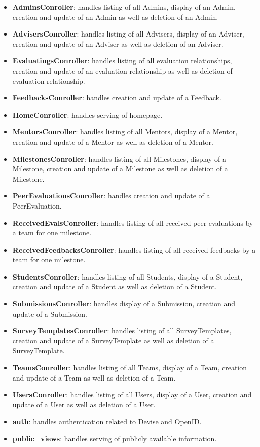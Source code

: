 \begin{itemize}
  \item \textbf{AdminsConroller}: handles listing of all Admins, display of an Admin, creation and update of an Admin as well as deletion of an Admin.
  \item \textbf{AdvisersConroller}: handles listing of all Advisers, display of an Adviser, creation and update of an Adviser as well as deletion of an Adviser.
  \item \textbf{EvaluatingsConroller}: handles listing of all evaluation relationships, creation and update of an evaluation relationship as well as deletion of evaluation relationship.
  \item \textbf{FeedbacksConroller}: handles creation and update of a Feedback.
  \item \textbf{HomeConroller}: handles serving of homepage.
  \item \textbf{MentorsConroller}: handles listing of all Mentors, display of a Mentor, creation and update of a Mentor as well as deletion of a Mentor.
  \item \textbf{MilestonesConroller}: handles listing of all Milestones, display of a Milestone, creation and update of a Milestone as well as deletion of a Milestone.
  \item \textbf{PeerEvaluationsConroller}: handles creation and update of a PeerEvaluation.
  \item \textbf{ReceivedEvalsConroller}: handles listing of all received peer evaluations by a team for one milestone.
  \item \textbf{ReceivedFeedbacksConroller}: handles listing of all received feedbacks by a team for one milestone.
  \item \textbf{StudentsConroller}: handles listing of all Students, display of a Student, creation and update of a Student as well as deletion of a Student.
  \item \textbf{SubmissionsConroller}: handles display of a Submission, creation and update of a Submission.
  \item \textbf{SurveyTemplatesConroller}: handles listing of all SurveyTemplates, creation and update of a SurveyTemplate as well as deletion of a SurveyTemplate.
  \item \textbf{TeamsConroller}: handles listing of all Teams, display of a Team, creation and update of a Team as well as deletion of a Team.
  \item \textbf{UsersConroller}: handles listing of all Users, display of a User, creation and update of a User as well as deletion of a User.
  \item \textbf{auth}: handles authentication related to Devise and OpenID.
  \item \textbf{public\_views}: handles serving of publicly available information.
\end{itemize}

